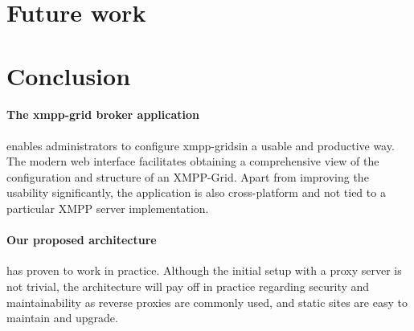 




\section{Future work}

\section{Conclusion}
\paragraph{The \gls{xmpp-grid} \gls{broker} application} enables administrators to configure \glspl{xmpp-grid}in a usable and productive way.
The modern web interface facilitates obtaining a comprehensive view of the configuration and structure of an XMPP-Grid.
Apart from improving the usability significantly, the application is also cross-platform and not tied to a particular XMPP server implementation.

\paragraph{Our proposed architecture} has proven to work in practice.
Although the initial setup with a proxy server is not trivial, the architecture will pay off in practice regarding security and maintainability as reverse proxies are commonly used, and static sites are easy to maintain and upgrade.

